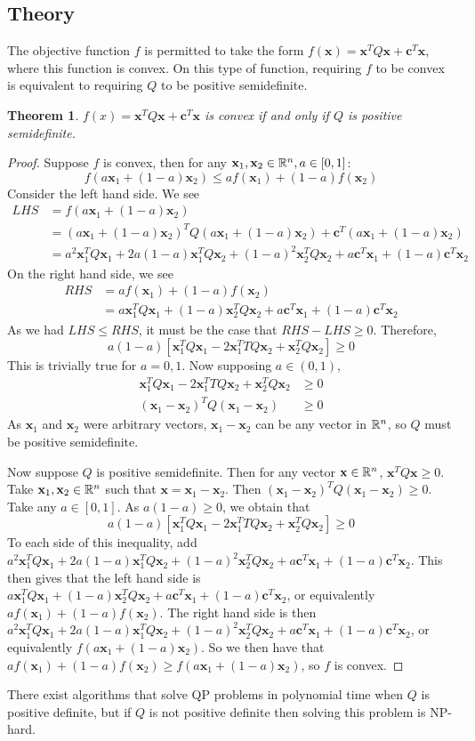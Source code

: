 \documentclass[10pt]{article}
\renewcommand{\vec}[1]{\mathbf{#1}}
\newcommand{\R}[1][]{ \ifx&#1& \mathbb{R} \else \mathbb{R}^{#1} \fi }
\newcommand{\affcomb}[3][a]{#1#2 + (1-#1)#3}
\newcommand{\x}{\vec{x}}
\renewcommand{\c}{\vec{c}}
\newtheorem{theorem}{Theorem}[section]
\begin{document}
\subsection{Theory}
The objective function $f$ is permitted to take the form $f(\x) = \x^TQ\x + \c^T\x$, where this function is convex. On this type of function, requiring $f$ to be convex is equivalent to requiring $Q$ to be positive semidefinite.\cite{jorge-numopt}
\begin{theorem}
	$f(x) = \x^TQ\x + \c^T\x$ is convex if and only if $Q$ is positive semidefinite.
\end{theorem}
\begin{proof}
	Suppose $f$ is convex, then for any $\x_1,\x_2\in\R[n], a\in[0,1]$:
	\[
	f(\affcomb{\x_1}{\x_2}) \leq \affcomb{f(\x_1)}{f(\x_2)}
	\]
	Consider the left hand side. We see
	\begin{align*}
		LHS &= f(\affcomb{\x_1}{\x_2})\\
		&= (\affcomb{\x_1}{\x_2})^TQ(\affcomb{\x_1}{\x_2}) + \c^T(\affcomb{\x_1}{\x_2})\\
		&= a^2\x_1^TQ\x_1 + 2a(1-a)\x_1^TQ\x_2 + (1-a)^2\x_2^TQ\x_2 + a\c^T\x_1 + (1-a)\c^T\x_2
	\end{align*}
	On the right hand side, we see
	\begin{align*}
		RHS &= \affcomb{f(\x_1)}{f(\x_2)}\\
		&= a\x_1^TQ\x_1 + (1-a)\x_2^TQ\x_2 + a\c^T\x_1 + (1-a)\c^T\x_2
	\end{align*}
	As we had $LHS \leq RHS$, it must be the case that $RHS-LHS \geq 0$. Therefore, 
	\[
		a(1-a)\left[\x_1^TQ\x_1 - 2\x_1^TTQ\x_2 + \x_2^TQ\x_2\right]\geq 0
	\]
	This is trivially true for $a =0, 1$. Now supposing $a\in(0,1)$, 
	\begin{align*}
		\x_1^TQ\x_1 - 2\x_1^TTQ\x_2 + \x_2^TQ\x_2&\geq 0\\
		(\x_1-\x_2)^TQ(\x_1-\x_2)&\geq 0
	\end{align*}
	As $\x_1$ and $\x_2$ were arbitrary vectors, $\x_1-\x_2$ can be any vector in $\R[n]$, so $Q$ must be positive semidefinite. 
	
	Now suppose $Q$ is positive semidefinite. Then for any vector $\x\in\R[n]$, $\x^TQ\x\geq 0$. Take $\x_1,\x_2\in\R[n]$ such that $\x=\x_1-\x_2$. Then $(\x_1-\x_2)^TQ(\x_1-\x_2)\geq 0$. Take any $a\in[0,1]$. As $a(1-a)\geq 0$, we obtain that \[
		a(1-a)\left[\x_1^TQ\x_1 - 2\x_1^TTQ\x_2 + \x_2^TQ\x_2\right]\geq 0
	\]
	To each side of this inequality, add $a^2\x_1^TQ\x_1 + 2a(1-a)\x_1^TQ\x_2 + (1-a)^2\x_2^TQ\x_2 + a\c^T\x_1 + (1-a)\c^T\x_2$. This then gives that the left hand side is $a\x_1^TQ\x_1 + (1-a)\x_2^TQ\x_2 + a\c^T\x_1 + (1-a)\c^T\x_2$, or equivalently $\affcomb{f(\x_1)}{f(\x_2)}$. The right hand side is then $a^2\x_1^TQ\x_1 + 2a(1-a)\x_1^TQ\x_2 + (1-a)^2\x_2^TQ\x_2 + a\c^T\x_1 + (1-a)\c^T\x_2$, or equivalently $f(\affcomb{\x_1}{\x_2})$. So we then have that $\affcomb{f(\x_1)}{f(\x_2)}\geq f(\affcomb{\x_1}{\x_2})$, so $f$ is convex.
\end{proof}
There exist algorithms that solve QP problems in polynomial time when $Q$ is positive definite\cite{kozlov-comp-qp}, but if $Q$ is not positive definite then solving this problem is NP-hard\cite{sahni}.
\end{document}
